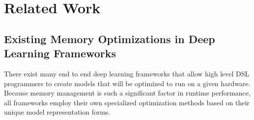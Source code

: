 
\chapter{Related Work} %

\label{Chapter2} %

\section{Existing Memory Optimizations in Deep Learning Frameworks}
There exist many end to end deep learning frameworks that allow
high level DSL programmers to create models that will be optimized to run
on a given hardware. Because memory management is such a significant
factor in runtime performance, all frameworks employ their own specialized
optimization methods based on their unique model representation forms.


